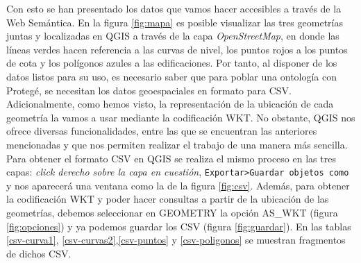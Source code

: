Con esto se han presentado los datos que vamos hacer accesibles a través de la Web Semántica. En la figura \ref{fig:mapa} es posible visualizar las tres geometrías juntas y localizadas en QGIS a través de la capa \textit{OpenStreetMap}, en donde las líneas verdes hacen referencia a las curvas de nivel, los puntos rojos a los puntos de cota y los polígonos azules a las edificaciones. Por tanto, al disponer de los datos listos para su uso, es necesario saber que para poblar una ontología con Protegé, se necesitan los datos geoespaciales en formato para CSV. Adicionalmente, como hemos visto, la representación de la ubicación de cada geometría la vamos a usar mediante la codificación WKT. No obstante, QGIS nos ofrece diversas funcionalidades, entre las que se encuentran las anteriores mencionadas y que nos permiten realizar el trabajo de una manera más sencilla.\\ 





Para obtener el formato CSV en QGIS se realiza el mismo proceso en las tres capas: \textit{click derecho sobre la capa en cuestión}, \texttt{Exportar>Guardar objetos como} y nos aparecerá una ventana como la de la figura \ref{fig:csv}. Además, para obtener la codificación WKT y poder hacer consultas a partir de la ubicación de las geometrías, debemos seleccionar en GEOMETRY la opción AS\_WKT (figura \ref{fig:opciones}) y ya podemos guardar los CSV (figura \ref{fig:guardar}). En las tablas \ref{csv-curva1}, \ref{csv-curvas2},\ref{csv-puntos} y \ref{csv-poligonos} se muestran fragmentos de dichos CSV.



